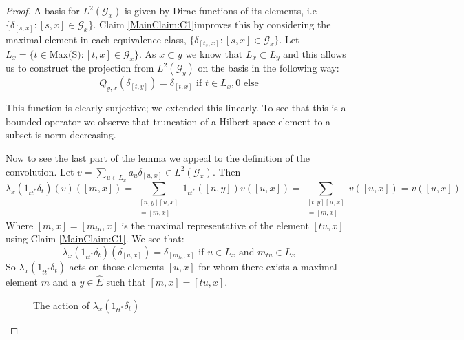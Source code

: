 \begin{proof}
A basis for $L^{2}(\mathcal{G}_{x})$ is given by Dirac functions of its elements, i.e $\lbrace \delta_{[s,x]} : [s,x] \in \mathcal{G}_{x} \rbrace$. Claim \ref{MainClaim:C1}improves this by considering the maximal element in each equivalence class, $\lbrace \delta_{[t_{s},x]} : [s,x] \in \mathcal{G}_{x} \rbrace$. Let $L_{x} = \lbrace t \in \text{Max(S)} : [t,x] \in \mathcal{G}_{x} \rbrace$. As $x \subset y$ we know that $L_{x} \subset L_{y}$ and this  allows us to construct the projection from $L^{2}(\mathcal{G}_{y})$ on the basis in the following way:
\begin{equation}
Q_{y,x}(\delta_{[t,y]})=\delta_{[t,x]} \mbox{ if } t \in L_{x}, 0 \mbox{ else}  
\end{equation}

This function is clearly surjective; we extended this linearly. To see that this is a bounded operator we observe that truncation of a Hilbert space element to a subset is norm decreasing.

Now to see the last part of the lemma we appeal to the definition of the convolution. Let $v = \sum_{u \in L_{x}} a_{u}\delta_{[u,x]} \in L^{2}(\mathcal{G}_{x})$. Then
\begin{equation*}
\lambda_{x}(1_{tt^{*}}\delta_{t})(v)([m,x])=\sum_{\substack{[n,y][u,x]\\=[m,x]}} 1_{tt^{*}}([n,y])v([u,x])=\sum_{\substack{[t,y][u,x]\\=[m,x]}}v([u,x])=v([u,x])
\end{equation*}
Where $[m,x]=[m_{tu},x]$ is the maximal representative of the element $[tu,x]$ using Claim \ref{MainClaim:C1}. We see that:
\begin{equation*}
\lambda_{x}(1_{tt^{*}}\delta_{t})(\delta_{[u,x]})= \delta_{[m_{tu},x]} \mbox{ if } u\in L_{x} \mbox{ and } m_{tu} \in L_{x}
\end{equation*}
So $\lambda_{x}(1_{tt^{*}}\delta_{t})$ acts on those elements $[u,x]$ for whom there exists a maximal element $m$ and a $y \in \widehat{E}$ such that $[m,x]=[tu,x]$. 

\begin{figure}\label{fig:F1}





\caption{The action of $\lambda_{x}(1_{tt^{*}}\delta_{t})$}

\end{figure}


\end{proof}
